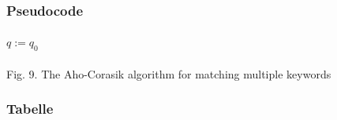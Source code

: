 \documentclass[10pt, a4paper]{article}
\begin{document}
\subsubsection{Pseudocode}
\paragraph{}
\begin{algorithm}[H]

 $q:=q_0$\\
 \par
 \bigskip
 
 \paragraph{}
 \caption{Fig. 9. The Aho-Corasik algorithm for matching multiple keywords}

\par
\end{algorithm}

\subsubsection{Tabelle}
\end{document}
